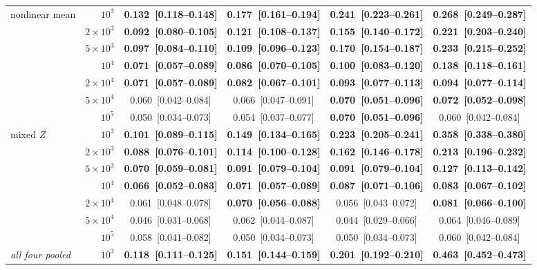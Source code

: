 {\begin{tabular}{lrcccc}
\midrule
nonlinear mean & $10^3$ & \textbf{0.132~[0.118--0.148]} & \textbf{0.177~[0.161--0.194]} & \textbf{0.241~[0.223--0.261]} & \textbf{0.268~[0.249--0.287]} \\
 & $2\times10^3$ & \textbf{0.092~[0.080--0.105]} & \textbf{0.121~[0.108--0.137]} & \textbf{0.155~[0.140--0.172]} & \textbf{0.221~[0.203--0.240]} \\
 & $5\times10^3$ & \textbf{0.097~[0.084--0.110]} & \textbf{0.109~[0.096--0.123]} & \textbf{0.170~[0.154--0.187]} & \textbf{0.233~[0.215--0.252]} \\
 & $10^4$ & \textbf{0.071~[0.057--0.089]} & \textbf{0.086~[0.070--0.105]} & \textbf{0.100~[0.083--0.120]} & \textbf{0.138~[0.118--0.161]} \\
 & $2\times10^4$ & \textbf{0.071~[0.057--0.089]} & \textbf{0.082~[0.067--0.101]} & \textbf{0.093~[0.077--0.113]} & \textbf{0.094~[0.077--0.114]} \\
 & $5\times10^4$ & 0.060~[0.042--0.084] & 0.066~[0.047--0.091] & \textbf{0.070~[0.051--0.096]} & \textbf{0.072~[0.052--0.098]} \\
 & $10^5$ & 0.050~[0.034--0.073] & 0.054~[0.037--0.077] & \textbf{0.070~[0.051--0.096]} & 0.060~[0.042--0.084] \\
\midrule
mixed $Z$ & $10^3$ & \textbf{0.101~[0.089--0.115]} & \textbf{0.149~[0.134--0.165]} & \textbf{0.223~[0.205--0.241]} & \textbf{0.358~[0.338--0.380]} \\
 & $2\times10^3$ & \textbf{0.088~[0.076--0.101]} & \textbf{0.114~[0.100--0.128]} & \textbf{0.162~[0.146--0.178]} & \textbf{0.213~[0.196--0.232]} \\
 & $5\times10^3$ & \textbf{0.070~[0.059--0.081]} & \textbf{0.091~[0.079--0.104]} & \textbf{0.091~[0.079--0.104]} & \textbf{0.127~[0.113--0.142]} \\
 & $10^4$ & \textbf{0.066~[0.052--0.083]} & \textbf{0.071~[0.057--0.089]} & \textbf{0.087~[0.071--0.106]} & \textbf{0.083~[0.067--0.102]} \\
 & $2\times10^4$ & 0.061~[0.048--0.078] & \textbf{0.070~[0.056--0.088]} & 0.056~[0.043--0.072] & \textbf{0.081~[0.066--0.100]} \\
 & $5\times10^4$ & 0.046~[0.031--0.068] & 0.062~[0.044--0.087] & 0.044~[0.029--0.066] & 0.064~[0.046--0.089] \\
 & $10^5$ & 0.058~[0.041--0.082] & 0.050~[0.034--0.073] & 0.050~[0.034--0.073] & 0.060~[0.042--0.084] \\
\midrule
\emph{all four pooled} & $10^3$ & \textbf{0.118~[0.111--0.125]} & \textbf{0.151~[0.144--0.159]} & \textbf{0.201~[0.192--0.210]} & \textbf{0.463~[0.452--0.473]} \\

\end{tabular}}
